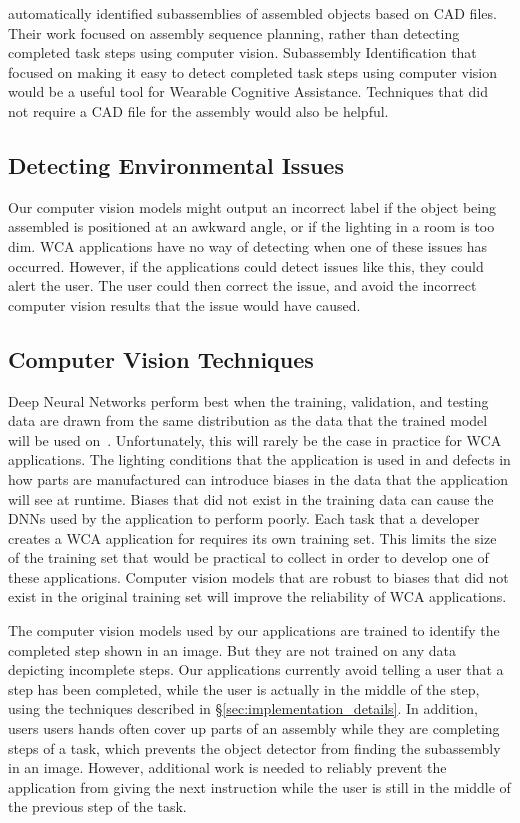 \citet{subassembly_identification} automatically identified subassemblies of
assembled objects based on CAD files.
Their work focused on assembly sequence
planning, rather than detecting completed task steps using computer vision.
Subassembly Identification that focused on making it easy to detect completed
task steps using computer vision would be a useful tool for Wearable Cognitive
Assistance.
Techniques that did not require a CAD file for the assembly would also be
helpful.

\subsection{Detecting Environmental Issues}

Our computer vision models might output an incorrect label if the object being
assembled is positioned at an awkward angle, or if the lighting in a room is
too dim.
WCA applications have no way of detecting when one of these issues has
occurred.
However, if the applications could detect issues like this, they could alert the
user.
The user could then correct the issue, and avoid the incorrect computer vision
results that the issue would have caused.

\subsection{Computer Vision Techniques}

Deep Neural Networks perform best when the training, validation, and testing
data are drawn from the same distribution as the data that the trained model
will be used on~\cite{pmlr-v97-recht19a}.
Unfortunately, this will rarely be the case in practice for WCA applications.
The lighting conditions that the application is used in and defects in how parts
are manufactured can introduce biases in the data that the application will see
at runtime.
Biases that did not exist in the training data can cause the DNNs used by the
application to perform poorly.
Each task that a developer creates a WCA application for requires its own
training set.
This limits the size of the training set that would be practical to collect in
order to develop one of these applications.
Computer vision models that are robust to biases that did not exist in the
original training set will improve the reliability of WCA applications.

The computer vision models used by our applications are trained to identify the
completed step shown in an image.
But they are not trained on any data depicting incomplete steps.
Our applications currently avoid telling a user that a step has been completed,
while the user is actually in the middle of the step, using the techniques
described in \S\ref{sec:implementation_details}.
In addition, users users hands often cover up parts of an assembly while they
are completing steps of a task, which prevents the object detector from finding
the subassembly in an image.
However, additional work is needed to reliably prevent the application from
giving the next instruction while the user is still in the middle of the
previous step of the task.

